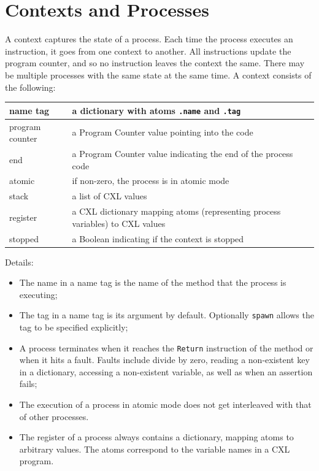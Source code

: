 \documentclass{report}
\begin{document}
\chapter{Contexts and Processes}
\label{app:context}

A context captures the state of a process.  Each time the process
executes an instruction, it goes from one context to another.
All instructions update the program counter, and so no instruction
leaves the context the same.
There may be multiple processes
with the same state at the same time.
A context consists of the following:

\vspace{1em}
\begin{tabular}{|l|l|}
\hline
name tag & a dictionary with atoms \texttt{.name} and \texttt{.tag} \\
\hline
program counter & a Program Counter value pointing into the code \\
\hline
end & a Program Counter value indicating the end of the process code \\
\hline
atomic & if non-zero, the process is in atomic mode \\
\hline
stack & a list of CXL values \\
\hline
register & a CXL dictionary mapping atoms (representing process variables) to CXL values \\
\hline
stopped & a Boolean indicating if the context is stopped \\
\hline
\end{tabular}
\vspace{1em}

Details:
\begin{itemize}
\item The name in a name tag is the name of the method that the process
is executing;
\item The tag in a name tag is its argument by default.  Optionally
\texttt{spawn} allows the tag to be specified explicitly;
\item A process terminates when it reaches the \texttt{Return} instruction
of the method or when it hits a fault.  Faults include divide by zero,
reading a non-existent key in a dictionary, accessing a non-existent
variable, as well as when an assertion fails;
\item The execution of a process in atomic mode does not get interleaved
with that of other processes.
\item The register of a process always contains a dictionary, mapping
atoms to arbitrary values.  The atoms correspond to the variable names
in a CXL program.
\end{itemize}
\end{document}
